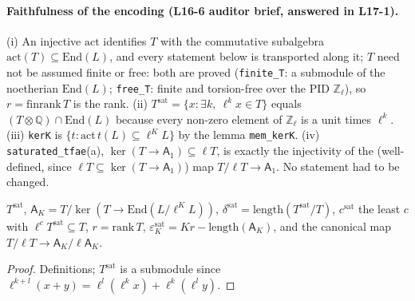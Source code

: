 \paragraph{Faithfulness of the encoding (L16-6 auditor brief, answered in L17-1).} (i) An injective $\mathrm{act}$ identifies $T$
with the commutative subalgebra $\mathrm{act}(T)\subseteq\mathrm{End}(L)$, and every statement below is transported along it;
$T$ need not be assumed finite or free: both are proved (\texttt{finite\_T}: a submodule of the noetherian $\mathrm{End}(L)$;
\texttt{free\_T}: finite and torsion-free over the PID $\mathbb Z_\ell$), so $r=\mathrm{finrank}\,T$ is the rank. (ii)
$T^{\mathrm{sat}}=\{x:\exists k,\ \ell^kx\in T\}$ equals $(T\otimes\mathbb Q)\cap\mathrm{End}(L)$ because every non-zero element of
$\mathbb Z_\ell$ is a unit times $\ell^k$. (iii) \texttt{kerK} is $\{t:\mathrm{act}\,t(L)\subseteq\ell^KL\}$ by the lemma
\texttt{mem\_kerK}. (iv) \texttt{saturated\_tfae}(a), $\ker(T\to\mathsf A_1)\subseteq\ell T$, is exactly the injectivity of the
(well-defined, since $\ell T\subseteq\ker(T\to\mathsf A_1)$) map $T/\ell T\to\mathsf A_1$. No statement had to be changed.

\begin{definition}\label{def:satdata}
  \leanok
  $T^{\mathrm{sat}}$, $\mathsf A_K=T/\ker(T\to\mathrm{End}(L/\ell^KL))$, $\delta^{\mathrm{sat}}=\mathrm{length}(T^{\mathrm{sat}}/T)$,
  $c^{\mathrm{sat}}$ the least $c$ with $\ell^cT^{\mathrm{sat}}\subseteq T$, $r=\mathrm{rank}\,T$,
  $\varepsilon^{\mathrm{sat}}_K=Kr-\mathrm{length}(\mathsf A_K)$, and the canonical map $T/\ell T\to\mathsf A_K/\ell\mathsf A_K$.
\end{definition}
\begin{proof}
  \leanok
  Definitions; $T^{\mathrm{sat}}$ is a submodule since $\ell^{k+l}(x+y)=\ell^l(\ell^kx)+\ell^k(\ell^ly)$.
\end{proof}

